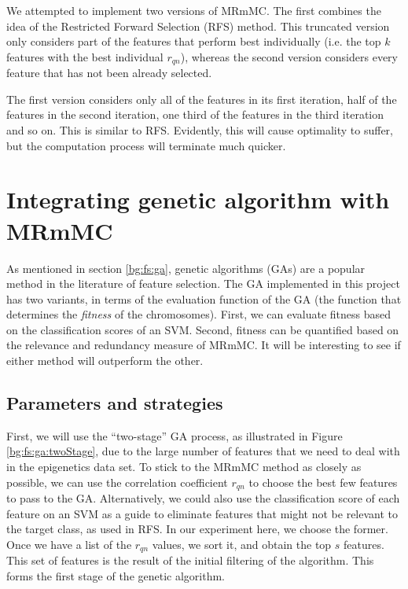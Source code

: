 \documentclass[12pt, twoside, a4paper]{report}
\begin{document}
We attempted to implement two versions of MRmMC. The first combines the idea of the Restricted Forward Selection (RFS) method. This truncated version only considers part of the features that perform best individually (i.e. the top $k$ features with the best individual $r_{qn}$), whereas the second version considers every feature that has not been already selected.

The first version considers only all of the features in its first iteration, half of the features in the second iteration, one third of the features in the third iteration and so on. This is similar to RFS. Evidently, this will cause optimality to suffer, but the computation process will terminate much quicker.


\section{Integrating genetic algorithm with MRmMC} \label{ga:mrmmc}

As mentioned in section \ref{bg:fs:ga}, genetic algorithms (GAs) are a popular method in the literature of feature selection. The GA implemented in this project has two variants, in terms of the evaluation function of the GA (the function that determines the \textit{fitness} of the chromosomes). First, we can evaluate fitness based on the classification scores of an SVM. Second, fitness can be quantified based on the relevance and redundancy measure of MRmMC. It will be interesting to see if either method will outperform the other.

\subsection{Parameters and strategies}
\label{body:ga:params}

First, we will use the ``two-stage'' GA process, as illustrated in Figure \ref{bg:fs:ga:twoStage}, due to the large number of features that we need to deal with in the epigenetics data set. To stick to the MRmMC method as closely as possible, we can use the correlation coefficient $r_{qn}$ to choose the best few features to pass to the GA. Alternatively, we could also use the classification score of each feature on an SVM as a guide to eliminate features that might not be relevant to the target class, as used in RFS. In our experiment here, we choose the former. Once we have a list of the $r_{qn}$ values, we sort it, and obtain the top $s$ features. This set of features is the result of the initial filtering of the algorithm. This forms the first stage of the genetic algorithm.
\end{document}
